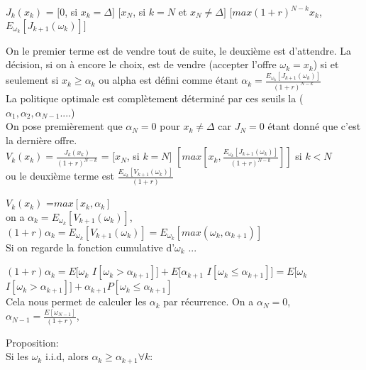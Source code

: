 \documentclass[oneside]{book}
\begin{document}
\centering
$J_k(x_k) $ = $[0 $, si $x_k = \Delta]$ $[x_N $, si $k = N $ et $ x_N \neq \Delta]$ $[max (1+r)^{N-k}x_k$, $E_{\omega_k}[J_{k+1}(\omega_k)]]$

\justify


On le premier terme est de vendre tout de suite, le deuxième est d'attendre. La décision, si on à encore le choix, est de vendre (accepter l'offre $\omega_k = x_k$) si et seulement si $x_k \geq \alpha_k$ ou alpha est défini comme étant $\alpha_k = \frac{E_{\omega_k}[J_{k+1}(\omega_k)]}{(1+r)^{N-k}}$ \\

La politique optimale est complètement déterminé par ces seuils la ($\alpha_1, \alpha_2, \alpha_{N-1} ....$)\\

On pose premièrement que $\alpha_N = 0$ pour $x_k \neq \Delta$ car $J_N = 0$ étant donné que c'est la dernière offre.\\

$V_k(x_k) = \frac{J_k(x_k)}{(1+r)^{N-k}}$ = $[x_N $, si $k=N]$ $[max[x_k, \frac{E_{\omega_k}[J_{k+1}(\omega_k)]}{(1+r)^{N-k}}]]$ si $k < N$\\

ou le deuxième terme est $\frac{E_{\omega_k}[V_{k+1}(\omega_k)]}{(1+r)}$

$V_k(x_k)$ =$max[x_k, \alpha_k]$\\

on a $\alpha_k = E_{\omega_k}[V_{k+1}(\omega_k)]$, $(1+r) \alpha_k = E_{\omega_k}[V_{k+1}(\omega_k)] = E_{\omega_k}[max(\omega_k, \alpha_{k+1})]$\\

Si on regarde la fonction cumulative d'$\omega_k$ ...\\


\centering

$(1+r)\alpha_k = E[\omega_k$ $ I[\omega_k > \alpha_{k+1}]] + E[\alpha_{k+1}$ $ I[\omega_k \leq \alpha_{k+1}]] = E[\omega_k $ $I[\omega_k > \alpha_{k+1}]] + \alpha_{k+1}P[\omega_k \leq \alpha_{k+1}]$\\

Cela nous permet de calculer les $\alpha_k$ par récurrence. On a $\alpha_N = 0$, $\alpha_{N-1} = \frac{E[\omega_{N-1}]}{(1+r)}$,
\justify



Proposition:\\

Si les $\omega_k$ i.i.d, alors $\alpha_k \geq \alpha_{k+1} \forall k$:
\end{document}

